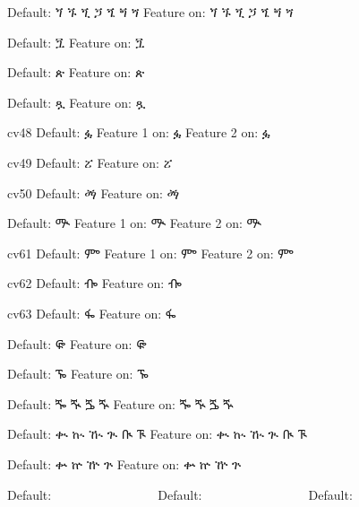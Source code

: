 \IndSS Default: ጘ ጙ ጚ ጛ ጜ ጝ ጞ
\IndSS\OTfortyoneone Feature on: ጘ ጙ ጚ ጛ ጜ ጝ ጞ

\IndSS Default: ጟ
\IndSS\OTfortytwoone Feature on: ጟ

\IndSS Default: ጵ
\IndSS\OTfortyfive Feature on: ጵ

\IndSS Default: ጿ
\IndSS\OTfortysix Feature on: ጿ

\IndSS cv48 Default: ፏ
\IndSS\OTfortyeightone Feature 1 on: ፏ
\IndSS\OTfortyeighttwo Feature 2 on: ፏ

\IndSS cv49 Default: ፘ
\IndSS\OTfortynine Feature on: ፘ

\IndSS cv50 Default: ፙ
\IndSS\OTfifty Feature on: ፙ

\IndSS Default: ᎁ
\IndSS\OTsixtyone Feature 1 on: ᎁ
\IndSS\OTsixtytwo Feature 2 on: ᎁ

\IndSS cv61  Default: ᎃ
\IndSS\OTsixtyoneone Feature 1 on: ᎃ
\IndSS\OTsixtyonetwo Feature 2 on: ᎃ

\IndSS cv62 Default: ᎇ
\IndSS\OTsixtytwoone Feature on: ᎇ

\IndSS cv63 Default: ᎊ
\IndSS\OTsixtythree Feature on: ᎊ

\IndSS Default: ᎋ
\IndSS\OTsixtyfour Feature on: ᎋ

\IndSS Default: ᎏ
\IndSS\OTsixtyfive Feature on: ᎏ

\IndSS Default: ⶓ ⶔ ⶕ ⶖ
\IndSS\OTseventy Feature on: ⶓ ⶔ ⶕ ⶖ

\IndSS Default: ቊ ኲ ዂ ጒ ᎅ ᎍ
\IndSS\OTeighty Feature on: ቊ ኲ ዂ ጒ ᎅ ᎍ

\IndSS Default: ቍ ኵ ዅ ጕ 
\IndSS\OTeightyfive Feature on: ቍ ኵ ዅ ጕ

\IndSS Default: 𞟠𞟡𞟢𞟣𞟤𞟥𞟦𞟨𞟩𞟪𞟫𞟭𞟮𞟰𞟱𞟲𞟳𞟴𞟵𞟶𞟷𞟸𞟹𞟺𞟻𞟼𞟽𞟾
\IndSS Default: 𞟠፟𞟡፟𞟢፟𞟣፟𞟤፟𞟥፟𞟦፟𞟨፟𞟩፟𞟪፟𞟫፟𞟭፟𞟮፟𞟰፟𞟱፟𞟲፟𞟳፟𞟴፟𞟵፟𞟶፟𞟷፟𞟸፟𞟹፟𞟺፟𞟻፟𞟼፟𞟽፟𞟾፟
\IndSS Default: 𞟫፟ሕ፟𞟲፟ቅ፟

\bye
